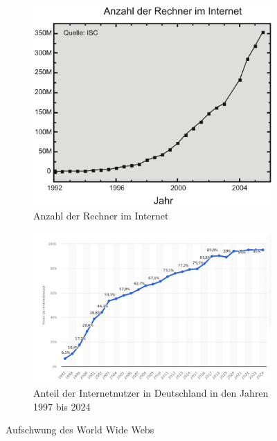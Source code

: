 \begin{figure}[h!]
    \centering
    \begin{subfigure}[b]{0.48\textwidth}
        \centering
        \includegraphics[width=\textwidth]{img/Anzahl_Rechner_im_Internet-2004.png}
        \caption{Anzahl der Rechner im Internet \cite{internet_systems_consortium_internet_2005}}
        \label{fig:rechner_internet}
		    \end{subfigure}
    \hfill
    \begin{subfigure}[b]{0.48\textwidth}
        \centering
        \includegraphics[width=\textwidth]{img/Anzahl_Internetnutzer-2024.png}
        \caption{Anteil der Internetnutzer in Deutschland in den Jahren 1997 bis 2024 \cite{statista_anteil_2024}}
        \label{fig:internetnutzer}
		\end{subfigure}
    \caption{Aufschwung des World Wide Webs}
    \label{fig:www}
\end{figure}


